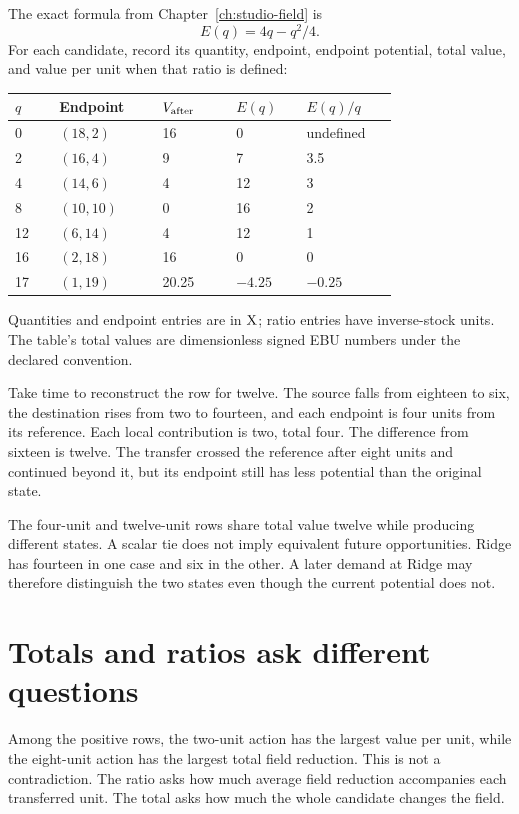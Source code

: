 The exact formula from Chapter~\ref{ch:studio-field} is
\begin{equation}
E(q)=4q-q^2/4.
\end{equation}
For each candidate, record its quantity, endpoint, endpoint potential, total value, and value per unit when that ratio is defined:
\begin{center}
\begin{tabular}{P{0.09\linewidth}P{0.21\linewidth}P{0.15\linewidth}P{0.14\linewidth}P{0.17\linewidth}}
\toprule
\(q\) & Endpoint & \(V_{\rm after}\) & \(E(q)\) & \(E(q)/q\)\\
 & \((18,2)\) & 16 & 0 & undefined\\
2 & \((16,4)\) & 9 & 7 & 3.5\\
4 & \((14,6)\) & 4 & 12 & 3\\
8 & \((10,10)\) & 0 & 16 & 2\\
12 & \((6,14)\) & 4 & 12 & 1\\
16 & \((2,18)\) & 16 & 0 & 0\\
17 & \((1,19)\) & 20.25 & \(-4.25\) & \(-0.25\)\\
\bottomrule
\end{tabular}
\end{center}
Quantities and endpoint entries are in \(\mathrm{X}\); ratio entries have inverse-stock units. The table's total values are dimensionless signed EBU numbers under the declared convention.

Take time to reconstruct the row for twelve. The source falls from eighteen to six, the destination rises from two to fourteen, and each endpoint is four units from its reference. Each local contribution is two, total four. The difference from sixteen is twelve. The transfer crossed the reference after eight units and continued beyond it, but its endpoint still has less potential than the original state.

The four-unit and twelve-unit rows share total value twelve while producing different states. A scalar tie does not imply equivalent future opportunities. Ridge has fourteen in one case and six in the other. A later demand at Ridge may therefore distinguish the two states even though the current potential does not.

\section{Totals and ratios ask different questions}

Among the positive rows, the two-unit action has the largest value per unit, while the eight-unit action has the largest total field reduction. This is not a contradiction. The ratio asks how much average field reduction accompanies each transferred unit. The total asks how much the whole candidate changes the field.

